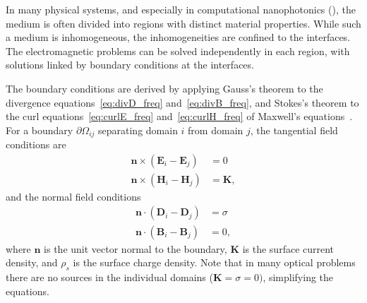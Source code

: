     In many physical systems, and especially in computational nanophotonics
    (), the medium is often divided into regions with distinct
    material properties. While such a medium is inhomogeneous, the inhomogeneities
    are confined to the interfaces. The electromagnetic problems can be solved
    independently in each region, with solutions linked by boundary conditions at
    the interfaces.
    
    The boundary conditions are derived by applying Gauss's theorem to
     the divergence equations~\eqref{eq:divD_freq} and~\eqref{eq:divB_freq}, and Stokes's
      theorem to the curl equations~\eqref{eq:curlE_freq} and~\eqref{eq:curlH_freq} of
       Maxwell's equations~\cite{novotny}.
       For a boundary $\partial \Omega_{ij}$ separating domain
$i$ from domain $j$, the tangential field conditions are~\cite{novotny}
    \begin{align}
        \mathbf{n} \times (\mathbf{E}_i - \mathbf{E}_j) & = 0 \label{eq:BC_E} \\
        \mathbf{n} \times (\mathbf{H}_i - \mathbf{H}_j) & = \mathbf{K} ,
        \label{eq:BC_H}
    \end{align}
    and the normal field conditions
    \begin{align}
        \mathbf{n} \cdot (\mathbf{D}_i - \mathbf{D}_j) & = \sigma \label{eq:BC_D} \\
        \mathbf{n} \cdot (\mathbf{B}_i - \mathbf{B}_j) & = 0, \label{eq:BC_B}
    \end{align}
    where $\mathbf{n}$ is the unit vector normal to the boundary, $\mathbf{K}$ is the
    surface current density,
    and $\rho_s$ is the surface charge density. Note that in many optical problems
    there are no
    sources in the individual domains ($\mathbf{K}=\sigma=0)$, simplifying the
    equations.

%

